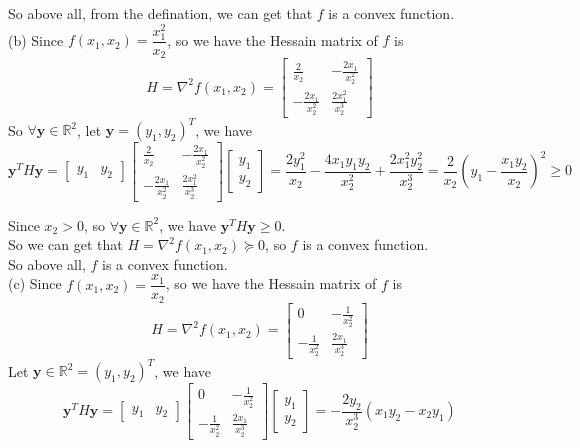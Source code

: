 \documentclass[10pt]{article}
\begin{document}
\begin{enumerate}[1.]
		  So above all, from the defination, we can get that $f$ is a convex function.\\

		  (b) Since $f(x_1,x_2)=\dfrac{x_1^2}{x_2}$, so we have the Hessain matrix of $f$ is
		  $$H=\nabla^2f(x_1,x_2)=
		  \begin{bmatrix}
		  \frac{2}{x_2} & -\frac{2x_1}{x_2^2}\\
		  -\frac{2x_1}{x_2^2} & \frac{2x_1^2}{x_2^3}
	      \end{bmatrix}$$
		  So $\forall\mathbf{y}\in\mathbb{R}^2$, let $\mathbf{y}=(y_1,y_2)^T$, we have
		  $$\mathbf{y}^TH\mathbf{y}=\begin{bmatrix}
		  y_1 & y_2\end{bmatrix}
	  	  \begin{bmatrix}\frac{2}{x_2} & -\frac{2x_1}{x_2^2}\\
	  	  -\frac{2x_1}{x_2^2} & \frac{2x_1^2}{x_2^3}\end{bmatrix}
		  \begin{bmatrix}y_1\\y_2\end{bmatrix}
		  =\frac{2y_1^2}{x_2}-\frac{4x_1y_1y_2}{x_2^2}+\frac{2x_1^2y_2^2}{x_2^3}=\dfrac{2}{x_2}\left(y_1-\dfrac{x_1y_2}{x_2}\right)^2\geq 0$$

		  Since $x_2 > 0$, so $\forall\mathbf{y}\in\mathbb{R}^2$, we have $\mathbf{y}^TH\mathbf{y}\geq 0$.\\
		  So we can get that $H=\nabla^2f(x_1,x_2)\succeq 0$, so $f$ is a convex function.\\

		  So above all, $f$ is a convex function.\\

		  (c) Since $f(x_1,x_2)=\dfrac{x_1}{x_2}$, so we have the Hessain matrix of $f$ is
		  $$H=\nabla^2f(x_1,x_2)=
		  \begin{bmatrix}
		  0 & -\frac{1}{x_2^2}\\
		  -\frac{1}{x_2^2} & \frac{2x_1}{x_2^3}
	      \end{bmatrix}$$
		  Let $\mathbf{y}\in\mathbb{R}^2=(y_1,y_2)^T$, we have
		  $$\mathbf{y}^TH\mathbf{y}=\begin{bmatrix}
		  y_1 & y_2\end{bmatrix}
		  \begin{bmatrix}0 & -\frac{1}{x_2^2}\\
		  -\frac{1}{x_2^2} & \frac{2x_1}{x_2^3}\end{bmatrix}
		  \begin{bmatrix}y_1\\y_2\end{bmatrix}
		  =-\dfrac{2y_2}{x_2^3}(x_1y_2-x_2y_1)$$
		  

\end{enumerate}
\end{document}
